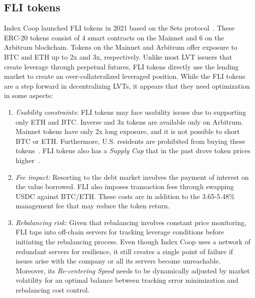 \subsection{FLI tokens}\label{subsec:fli}
Index Coop launched FLI tokens in 2021 based on the Sets protocol~\cite{FLI_Sets}. These ERC-20 tokens consist of 4 smart contracts on the Mainnet and 6 on the Arbitrum blockchain. Tokens on the Mainnet and Arbitrum offer exposure to BTC and ETH up to 2x and 3x, respectively. Unlike most LVT issuers that create leverage through perpetual futures, FLI tokens directly use the lending market to create an over-collateralized leveraged position. While the FLI tokens are a step forward in decentralizing LVTs, it appears that they need optimization in some aspects:
\begin{enumerate}[label={\ref{subsec:fli}.\arabic*},leftmargin=*]
	\item \textit{Usability constraints:} FLI tokens may face usability issues due to supporting only ETH and BTC. Inverse and 3x tokens are available only on Arbitrum. Mainnet tokens have only 2x long exposure, and it is not possible to short BTC or ETH. Furthermore, U.S. residents are prohibited from buying these tokens~\cite{FLI_Restricted}. FLI tokens also has a \textit{Supply Cap} that in the past drove token prices higher~\cite{FLI_Shortage}.
	
	\item \textit{Fee impact:} Resorting to the debt market involves the payment of interest on the value borrowed. FLI also imposes transaction fees through swapping USDC against BTC/ETH. These costs are in addition to the 3.65-5.48\% management fee that may reduce the token return.
	
	\item \textit{Rebalancing risk:} Given that rebalancing involves constant price monitoring, FLI taps into off-chain servers for tracking leverage conditions before initiating the rebalancing process. Even though Index Coop uses a network of redundant servers for resilience, it still creates a single point of failure if issues arise with the company or all its servers become unreachable. Moreover, its \textit{Re-centering Speed} needs to be dynamically adjusted by market volatility for an optimal balance between tracking error minimization and rebalancing cost control.
\end{enumerate}

